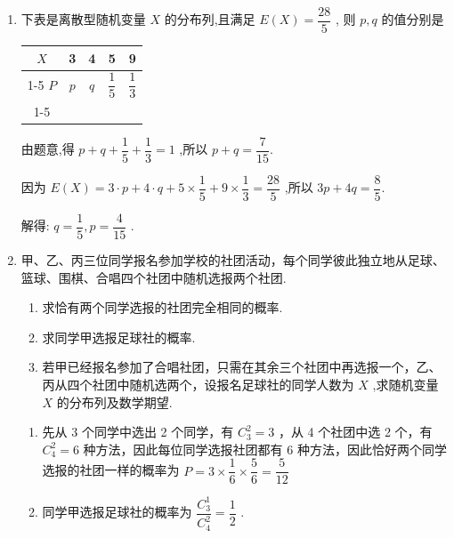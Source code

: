 \begin{enumerate}
\begin{enumerate}
        \item 下表是离散型随机变量 $X$ 的分布列,且满足 $E\left( X\right)  = \dfrac{28}{5}$ , 则 $p,q$ 的值分别是
        
        \begin{center}
        
        \begin{tabular}{|c|c|c|c|c|}
        \hline
        $X$ & 3 & 4 & 5 & 9 \\
        \cline{1-5}
        $P$ & $p$ & $q$ & $\dfrac{1}{5}$ & $\dfrac{1}{3}$ \\
        \cline{1-5}
        \hline
        \end{tabular}
        
        \end{center}
        \begin{jieda}
            由题意,得 $p + q + \dfrac{1}{5} + \dfrac{1}{3} = 1$ ,所以 $p + q = \dfrac{7}{15}$.
            
            因为 $E\left( X\right)  = 3 \cdot  p + 4 \cdot  q + 5 \times  \dfrac{1}{5} + 9 \times  \dfrac{1}{3} = \dfrac{28}{5}$ ,所以 ${3p} + {4q} = \dfrac{8}{5}$.
            
            解得: $q = \dfrac{1}{5},p = \dfrac{4}{15}$ .
        \end{jieda} 
        \item 甲、乙、丙三位同学报名参加学校的社团活动，每个同学彼此独立地从足球、篮球、围棋、合唱四个社团中随机选报两个社团.
        \begin{enumerate}
            \item 求恰有两个同学选报的社团完全相同的概率.
            \item 求同学甲选报足球社的概率.
            \item 若甲已经报名参加了合唱社团，只需在其余三个社团中再选报一个，乙、丙从四个社团中随机选两个，设报名足球社的同学人数为 $X$ ,求随机变量 $X$ 的分布列及数学期望.
        \end{enumerate}
        \begin{jieda}
            \begin{enumerate}
                \item 先从 3 个同学中选出 2 个同学，有 $C_{3}^{2} = 3$ ，从 4 个社团中选 2 个，有 $C_{4}^{2} = 6$ 种方法，因此每位同学选报社团都有 6 种方法，因此恰好两个同学选报的社团一样的概率为 $P = 3 \times  \dfrac{1}{6} \times  \dfrac{5}{6} = \dfrac{5}{12}$

                \item 同学甲选报足球社的概率为 $\dfrac{C_{3}^1}{C_{4}^{2}} = \dfrac{1}{2}$ .


\end{enumerate}
\end{jieda}
\end{enumerate}
\end{enumerate}
